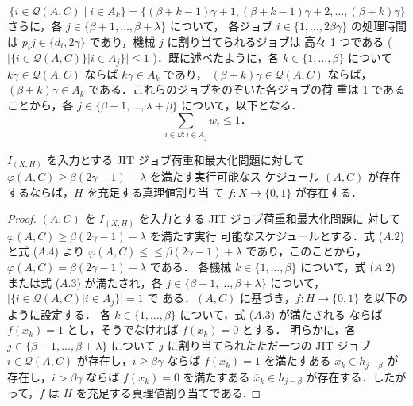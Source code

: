 \documentclass[12pt]{optlab-bachelor}
\begin{document}
\begin{equation}
  \{i \in \mathcal{Q}(A,C) \mid i \in A_k\} = \{(\beta + k -
  1)\gamma + 1, (\beta + k
  - 1)\gamma + 2,\ldots,(\beta + k)\gamma\} \tag{A.3}
\end{equation}
さらに，各 $j \in \{\beta + 1,\ldots, \beta + \lambda \}$ について，
各ジョブ $i \in \{1,\ldots, 2\beta \gamma \}$ の処理時間は $p_ij
\in \{d_i, 2\gamma \}$ であり，機械 $j$ に割り当てられるジョブは
高々 1 つである ( $|\{i \in \mathcal{Q}(A, C)\} | i \in A_j \}| \le 1$
)．既に述べたように，各 $k \in \{1,\ldots,\beta \}$ について
$k\gamma \in \mathcal{Q}(A,C)$ ならば $k\gamma \in A_k$ であり，
$(\beta + k) \gamma \in \mathcal{Q}(A,C)$ ならば，$(\beta +
k)\gamma \in A_k$ である．これらのジョブをのぞいた各ジョブの荷
重は 1 であることから，各 $j \in \{ \beta + 1,\ldots,
\lambda + \beta \}$ について，以下となる．
\begin{equation}
  \displaystyle \sum_{i \in \mathcal{Q}:i \in A_j}w_i \le 1 ．\tag{A.4}
\end{equation}

\begin{lemma}\label{l_2}
  $I_{(X,H)}$ を入力とする JIT ジョブ荷重和最大化問題に対して
  $\varphi(A, C) \ge \beta(2\gamma − 1) + \lambda$ を満たす実行可能なス
  ケジュール $(A, C)$ が存在するならば，$H$ を充足する真理値割り当
  て $f : X \to \{0, 1\}$ が存在する．
\end{lemma}

\begin{proof}
  $(A, C)$ を $I_{(X,H)}$ を入力とする JIT ジョブ荷重和最大化問題に
  対して $\varphi(A, C) \ge \beta (2\gamma − 1) + \lambda$ を満たす実行
  可能なスケジュールとする．式 ($A.2$) と式 ($A.4$) より $\varphi(A, C
  )\le≤ \beta(2\gamma − 1) + \lambda$ であり，このことから，
  $\varphi(A, C) = \beta (2\gamma − 1) + \lambda$ である．
  各機械 $k \in \{1,\ldots, \beta\}$ について，式 ($A.2$) または式
  ($A.3$) が満たされ，各 $j \in \{ \beta + 1,\ldots,\beta + \lambda
  \}$ について，$|\{ i \in \mathcal{Q}(A,C) | i \in A_j \} | = 1$ で
  ある．$(A,C)$ に基づき，$f : H \to \{0,1\}$ を以下のように設定する．
  各 $k \in \{1,\ldots, \beta \}$ について，式 ($A.3$) が満たされる
  ならば $f(x_k) = 1$ とし，そうでなければ $f(x_k) = 0$ とする．
  明らかに，各 $j \in \{\beta + 1,\ldots,\beta + \lambda \}$ について
  $j$ に割り当てられたただ一つの JIT ジョブ $i \in
  \mathcal{Q}(A,C)$ が存在し，$i \ge \beta \gamma$ ならば $f(x_k)
  = 1$ を満たすある $x_k \in h_{j - \beta}$ が存在し，$i > \beta
  \gamma$ ならば $f(x_k) = 0$ を満たすある $\bar x_k \in h_{j -
  \beta}$ が存在する．したがって，$f$ は $H$ を充足する真理値割り当てである.
\end{proof}
\end{document}

